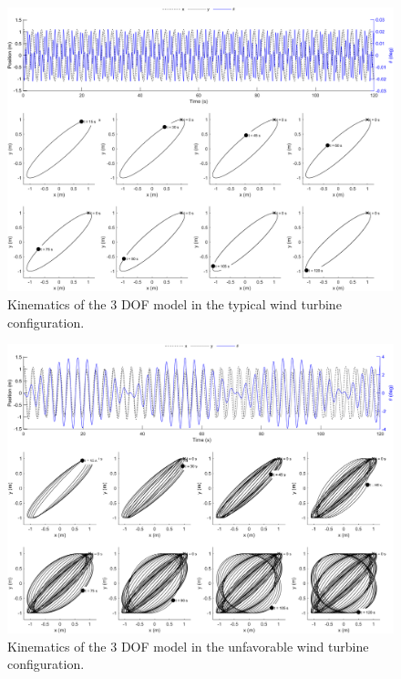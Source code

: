 \documentclass{article}
\begin{document}
\begin{figure}
    \centering
    \includegraphics[width=\textwidth]{manuscript/figures/turbine_typical.png}
    \caption{Kinematics of the 3 DOF model in the typical wind turbine configuration.}
    \label{fig:3dof-turbine-typical}
\end{figure}

\begin{figure}
    \centering
    \includegraphics[width=\textwidth]{manuscript/figures/turbine_unfavorable.png}
    \caption{Kinematics of the 3 DOF model in the unfavorable wind turbine configuration.}
    \label{fig:3dof-turbine-unfavorable}
\end{figure}

\clearpage
\end{document}
